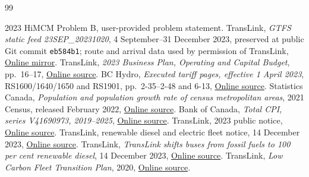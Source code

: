 \documentclass[12pt,letterpaper]{article}
\begin{document}
\clearpage
{}
\begin{thebibliography}{99}
\small
\raggedright
\setlength{\itemsep}{0.1em}
\setlength{\parskip}{0pt}
 2023 HiMCM Problem B, user-provided problem statement.
 TransLink, \emph{GTFS static feed 23SEP\_20231020}, 4 September--31 December 2023, preserved at public Git commit \texttt{eb584b1}; route and arrival data used by permission of TransLink, \href{https://github.com/JaydenCWong/JAAM-project/tree/eb584b1108b0d582ae31c7db8e0d7e7b5ba1702b/backend/engine/translink_data}{Online mirror}.
 TransLink, \emph{2023 Business Plan, Operating and Capital Budget}, pp.~16--17, \href{https://www.translink.ca/-/media/translink/documents/about-translink/corporate-reports/business_plan/2023_business_plan_operating_and_capital_budget.pdf}{Online source}.
 BC Hydro, \emph{Executed tariff pages, effective 1 April 2023}, RS1600/1640/1650 and RS1901, pp.~2-35--2-48 and 6-13, \href{https://www.bchydro.com/content/dam/BCHydro/customer-portal/documents/corporate/suppliers/transmission-scheduling/bulletins/2023/2023_08_03_BCUC_EXEC_TRFF_PGS.pdf}{Online source}.
 Statistics Canada, \emph{Population and population growth rate of census metropolitan areas}, 2021 Census, released February 2022, \href{https://www150.statcan.gc.ca/n1/daily-quotidien/220209/t002a-eng.htm}{Online source}.
 Bank of Canada, \emph{Total CPI, series V41690973, 2019--2025}, \href{https://www.bankofcanada.ca/valet/observations/V41690973/json?start_date=2019-01-01&end_date=2025-12-31}{Online source}.
 TransLink, 2023 public notice, \href{https://www.translink.ca/news/2023/february/translink\%20begins\%20battery-electric\%20bus\%20fleet\%20expansion}{Online source}.
 TransLink, renewable diesel and electric fleet notice, 14 December 2023, \href{https://www.translink.ca/news/2023/december/metro\%20vancouver\%20diesel\%20buses\%20transitioning\%20to\%20cleaner\%20renewable\%20fuel}{Online source}.
 TransLink, \emph{TransLink shifts buses from fossil fuels to 100 per cent renewable diesel}, 14 December 2023, \href{https://buzzer.translink.ca/2023/12/translink-shifts-buses-from-fossil-fuels-to-100-per-cent-renewable-diesel/}{Online source}.
 TransLink, \emph{Low Carbon Fleet Transition Plan}, 2020, \href{https://www.translink.ca/-/media/translink/documents/about-translink/policies/translink_low_carbon_fleet_transition_plan_2020_02_24.pdf}{Online source}.

\end{thebibliography}
\end{document}
